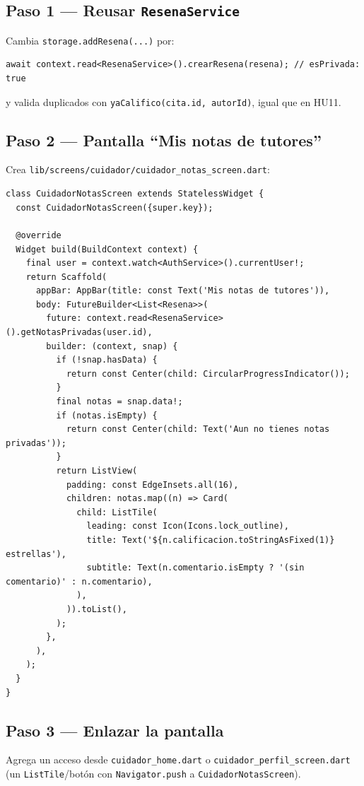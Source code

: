 \documentclass[11pt,a4paper]{article}
\begin{document}
\subsection{Paso 1 — Reusar \texttt{ResenaService}}
Cambia \texttt{storage.addResena(...)} por:
\begin{lstlisting}
await context.read<ResenaService>().crearResena(resena); // esPrivada: true
\end{lstlisting}
y valida duplicados con \texttt{yaCalifico(cita.id, autorId)}, igual que en HU11.

\subsection{Paso 2 — Pantalla ``Mis notas de tutores''}
Crea \texttt{lib/screens/cuidador/cuidador\_notas\_screen.dart}:

\begin{lstlisting}
class CuidadorNotasScreen extends StatelessWidget {
  const CuidadorNotasScreen({super.key});

  @override
  Widget build(BuildContext context) {
    final user = context.watch<AuthService>().currentUser!;
    return Scaffold(
      appBar: AppBar(title: const Text('Mis notas de tutores')),
      body: FutureBuilder<List<Resena>>(
        future: context.read<ResenaService>().getNotasPrivadas(user.id),
        builder: (context, snap) {
          if (!snap.hasData) {
            return const Center(child: CircularProgressIndicator());
          }
          final notas = snap.data!;
          if (notas.isEmpty) {
            return const Center(child: Text('Aun no tienes notas privadas'));
          }
          return ListView(
            padding: const EdgeInsets.all(16),
            children: notas.map((n) => Card(
              child: ListTile(
                leading: const Icon(Icons.lock_outline),
                title: Text('${n.calificacion.toStringAsFixed(1)} estrellas'),
                subtitle: Text(n.comentario.isEmpty ? '(sin comentario)' : n.comentario),
              ),
            )).toList(),
          );
        },
      ),
    );
  }
}
\end{lstlisting}

\subsection{Paso 3 — Enlazar la pantalla}
Agrega un acceso desde \texttt{cuidador\_home.dart} o
\texttt{cuidador\_perfil\_screen.dart} (un \texttt{ListTile}/botón con
\texttt{Navigator.push} a \texttt{CuidadorNotasScreen}).
\end{document}
